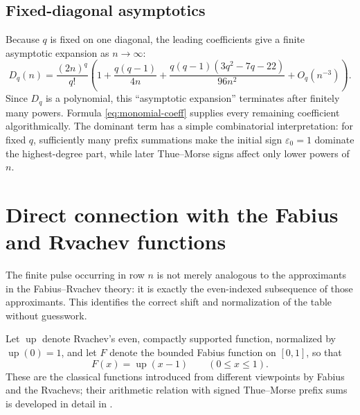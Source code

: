 \documentclass[11pt]{article}
\theoremstyle{definition}
\theoremstyle{remark}
\newcommand{\eps}{\varepsilon}
\newcommand{\Diag}{D}
\newcommand{\Up}{\operatorname{up}}
\begin{document}
\subsection{Fixed-diagonal asymptotics}

Because \(q\) is fixed on one diagonal, the leading coefficients give a
finite asymptotic expansion as \(n\to\infty\):
\begin{equation}
 \Diag_q(n)=\frac{(2n)^q}{q!}
 \left(
 1+\frac{q(q-1)}{4n}
 +\frac{q(q-1)(3q^2-7q-22)}{96n^2}
 +O_q(n^{-3})
 \right).                                                  \label{eq:diag-asymp}
\end{equation}
Since \(\Diag_q\) is a polynomial, this ``asymptotic expansion'' terminates
after finitely many powers.  Formula \cref{eq:monomial-coeff} supplies every
remaining coefficient algorithmically.  The dominant term has a simple
combinatorial interpretation: for fixed \(q\), sufficiently many prefix
summations make the initial sign \(\eps_0=1\) dominate the highest-degree
part, while later Thue--Morse signs affect only lower powers of \(n\).


\section{Direct connection with the Fabius and Rvachev functions}
\label{sec:fabius-connection}

The finite pulse occurring in row \(n\) is not merely analogous to the
approximants in the Fabius--Rvachev theory: it is exactly the even-indexed
subsequence of those approximants.  This identifies the correct shift and
normalization of the table without guesswork.

Let \(\Up\) denote Rvachev's even, compactly supported function, normalized
by \(\Up(0)=1\), and let \(F\) denote the bounded Fabius function on
\([0,1]\), so that
\begin{equation}
 F(x)=\Up(x-1)\qquad(0\leq x\leq1).                       \label{eq:F-up}
\end{equation}
These are the classical functions introduced from different viewpoints by
Fabius and the Rvachevs; their arithmetic relation with signed Thue--Morse
prefix sums is developed in detail in \cite{Fabius1966,Rvachev1971,Arias2018,ProveIt}.
\end{document}
